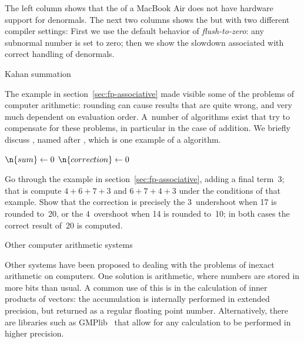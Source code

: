 The left column shows that the  of a MacBook Air
does not have hardware support for denormals.
The next two columns shows the 
but with two different compiler settings:
First we use the default behavior of
\emph{flush-to-zero}:
any subnormal number is set to zero;
then we show the slowdown associated with correct handling
of denormals.

\begin{multicols}{3}
  \scriptsize
  
  \columnbreak
  
  \columnbreak
  
\end{multicols}

 {Kahan summation}
\label{sec:arith-kahan}

The example in section~\ref{sec:fp-associative} made visible some of
the problems of computer arithmetic: rounding can cause results that
are quite wrong, and very much dependent on evaluation order. A~number
of algorithms exist that try to compensate for these problems, in
particular in the case of addition. We briefly discuss
\cite{Kahan:1965:summation}, named after
, which is one example of a
 algorithm.

\begin{displayalgorithm}
  $\n{sum}\leftarrow0$\;
  $\n{correction}\leftarrow0$\;
\end{displayalgorithm}

\begin{exercise}
  \label{ex:kahan-sum}
  Go through the example in section~\ref{sec:fp-associative}, adding a
  final term~3; that is compute $4+6+7+3$ and $6+7+4+3$ under the
  conditions of that example.
  Show that the correction is precisely the $3$~undershoot when 17 is rounded
  to~20, or the $4$~overshoot when 14 is rounded to~10; in both cases
  the correct result of~20 is computed.
\end{exercise}

 {Other computer arithmetic systems}

Other systems have been proposed to dealing with the problems of
inexact arithmetic on computers. One solution is 
arithmetic, where numbers are stored in more bits than usual. A common
use of this is in the calculation of inner products of vectors: the
accumulation is internally performed in extended precision, but
returned as a regular floating point number. Alternatively, there are
libraries such as GMPlib~\cite{gmplib} that allow for any calculation
to be performed in higher precision.


